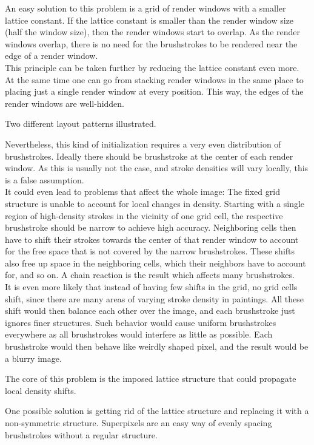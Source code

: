 An easy solution to this problem is a grid of render windows with a smaller lattice constant.
If the lattice constant is smaller than the render window size (\eg half the window size), then the render windows start to overlap.
As the render windows overlap, there is no need for the brushstrokes to be rendered near the edge of a render window.\\
This principle can be taken further by reducing the lattice constant even more.
At the same time one can go from stacking render windows in the same place to placing just a single render window at every position.
This way, the edges of the render windows are well-hidden.
\begin{marginfigure}
    \caption{Two different layout patterns illustrated.}
\end{marginfigure}

Nevertheless, this kind of initialization requires a very even distribution of brushstrokes.
Ideally there should be brushstroke at the center of each render window.
As this is usually not the case, and stroke densities will vary locally, this is a false assumption. \\
It could even lead to problems that affect the whole image:
The fixed grid structure is unable to account for local changes in density.
Starting with a single region of high-density strokes in the vicinity of one grid cell, the respective brushstroke should be narrow to achieve high accuracy.
Neighboring cells then have to shift their strokes towards the center of that render window to account for the free space that is not covered by the narrow brushstrokes.
These shifts also free up space in the neighboring cells, which their neighbors have to account for, and so on.
A chain reaction is the result which affects many brushstrokes. \\
It is even more likely that instead of having few shifts in the grid, no grid cells shift, since there are many areas of varying stroke density in paintings.
All these shift would then balance each other over the image, and each brushstroke just ignores finer structures.
Such behavior would cause uniform brushstrokes everywhere as all brushstrokes would interfere as little as possible.
Each brushstroke would then behave like weirdly shaped pixel, and the result would be a blurry image.

The core of this problem is the imposed lattice structure that could propagate local density shifts.

One possible solution is getting rid of the lattice structure and replacing it with a non-symmetric structure.
Superpixels are an easy way of evenly spacing brushstrokes without a regular structure.

